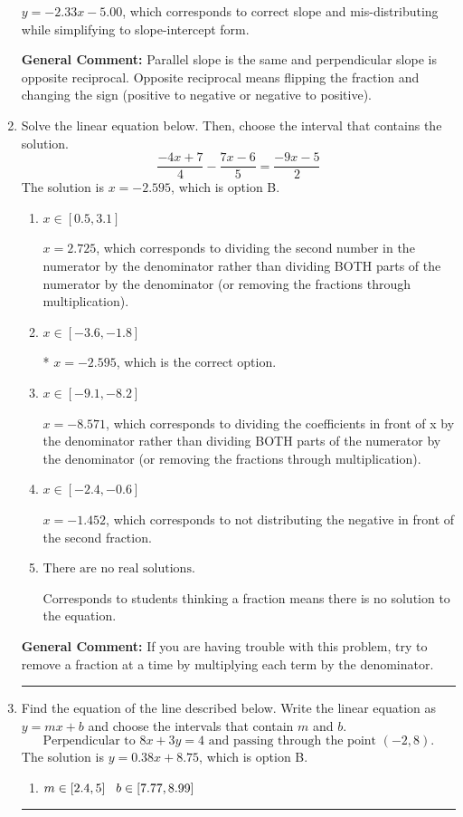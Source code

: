 \documentclass{extbook}[14pt]
\newcommand{\litem}[1]{\item #1

\rule{\textwidth}{0.4pt}}
\begin{document}
\begin{enumerate}
{\begin{enumerate}[label=\Alph*.]
 $y = -2.33x - 5.00$, which corresponds to correct slope and mis-distributing while simplifying to slope-intercept form.
\end{enumerate}

\textbf{General Comment:} Parallel slope is the same and perpendicular slope is opposite reciprocal. Opposite reciprocal means flipping the fraction and changing the sign (positive to negative or negative to positive).
}
\litem{
Solve the linear equation below. Then, choose the interval that contains the solution.
\[ \frac{-4x + 7}{4} - \frac{7x -6}{5} = \frac{-9x -5}{2} \]The solution is \( x = -2.595 \), which is option B.\begin{enumerate}[label=\Alph*.]
\item \( x \in [0.5, 3.1] \)

 $x = 2.725$, which corresponds to dividing the second number in the numerator by the denominator rather than dividing BOTH parts of the numerator by the denominator (or removing the fractions through multiplication).
\item \( x \in [-3.6, -1.8] \)

* $x = -2.595$, which is the correct option.
\item \( x \in [-9.1, -8.2] \)

 $x = -8.571$, which corresponds to dividing the coefficients in front of x by the denominator rather than dividing BOTH parts of the numerator by the denominator (or removing the fractions through multiplication).
\item \( x \in [-2.4, -0.6] \)

 $x = -1.452$, which corresponds to not distributing the negative in front of the second fraction.
\item \( \text{There are no real solutions.} \)

Corresponds to students thinking a fraction means there is no solution to the equation.
\end{enumerate}

\textbf{General Comment:} If you are having trouble with this problem, try to remove a fraction at a time by multiplying each term by the denominator.
}
\litem{
Find the equation of the line described below. Write the linear equation as $ y=mx+b $ and choose the intervals that contain $m$ and $b$.
\[ \text{Perpendicular to } 8 x + 3 y = 4 \text{ and passing through the point } (-2, 8). \]The solution is \( y = 0.38x + 8.75 \), which is option B.\begin{enumerate}[label=\Alph*.]
\item \( m \in [2.4, 5] \hspace*{3mm} b \in [7.77, 8.99] \)


\end{enumerate}}
\end{enumerate}
\end{document}
